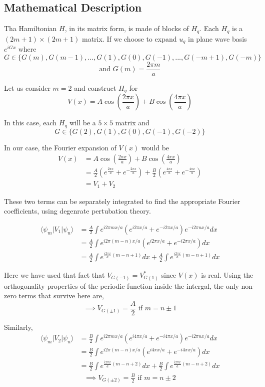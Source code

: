 \documentclass[12pt,a4paper]{article}
\begin{document}
\subsection{Mathematical Description} \label{1.2}
Tha Hamiltonian $H$, in its matrix form, is made of blocks of $H_q$. Each $H_q$ is a $(2m+1) \times (2m+1)$ matrix. If we choose to expand $u_q$ in plane wave basis ${e^{iGx}}$ where $$G \in \{ G(m),G(m-1),...,G(1),G(0),G(-1),...,G(-m+1), G(-m) \}$$ $$\text{and }G(m)=\frac{2\pi m}{a}$$

Let us consider $m=2$ and construct $H_q$ for $$V(x)= A\cos\left(\frac{2\pi x}{a}\right) + B\cos\left(\frac{4\pi x}{a}\right)$$

In this case, each $H_q$ will be a $5 \times 5$ matrix and $$G \in \{ G(2),G(1),G(0),G(-1),G(-2)\}$$

In our case, the Fourier expansion of $V(x)$ would be
\begin{align*}
    V(x) &= A\cos\left(\frac{2\pi x}{a}\right) + B\cos\left(\frac{4\pi x}{a}\right)\\
    &=\frac{A}{2}\left(e^{\frac{2\pi x}{a}}+e^{-\frac{2\pi x}{a}}\right) + \frac{B}{2}\left(e^{\frac{4\pi x}{a}}+e^{-\frac{4\pi x}{a}}\right)\\
    &= V_1 + V_2
\end{align*}

These two terms can be separately integrated to find the appropriate Fourier coefficients, using degenrate pertubation theory.

\begin{align*}
    \langle \psi_m | V_1 | \psi_n \rangle &= \frac{A}{2}\int e^{i2\pi mx/a} \left(e^{i2\pi x/a} + e^{-i2\pi x/a} \right) e^{-i2\pi nx/a} dx\\
    &= \frac{A}{2}\int e^{i2\pi (m-n)x/a} \left(e^{i2\pi x/a} + e^{-i2\pi x/a} \right) dx\\
    &= \frac{A}{2}\int e^{\frac{i2\pi x}{a}(m-n+1)} dx + \frac{A}{2}\int e^{\frac{i2\pi x}{a}(m-n+1)} dx
\end{align*}

Here we have used that fact that $V_{G(-1)} = V^*_{G(1)}$ since $V (x)$ is real.
Using the orthogonality properties of the periodic function inside the intergal, the only non-zero terms that survive here are,
$$\implies \boxed{V_{G(\pm 1)} = \frac{A}{2} \text{ if }m = n \pm 1}$$

Similarly,
\begin{align*}
    \langle \psi_m | V_2 | \psi_n \rangle &= \frac{B}{2}\int e^{i2\pi mx/a} \left(e^{i4\pi x/a} + e^{-i4\pi x/a} \right) e^{-i2\pi nx/a} dx\\
    &= \frac{B}{2}\int e^{i2\pi (m-n)x/a} \left(e^{i4\pi x/a} + e^{-i4\pi x/a} \right) dx\\
    &= \frac{B}{2}\int e^{\frac{i2\pi x}{a}(m-n+2)} dx + \frac{B}{2}\int e^{\frac{i2\pi x}{a}(m-n+2)} dx
\end{align*}
\begin{align*}
    \implies \boxed{V_{G(\pm 2)} = \frac{B}{2} \text{ if }m = n \pm 2}
\end{align*}
\end{document}
